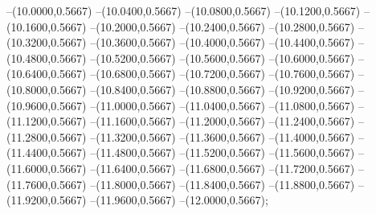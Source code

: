 {	--(10.0000,0.5667)
	--(10.0400,0.5667)
	--(10.0800,0.5667)
	--(10.1200,0.5667)
	--(10.1600,0.5667)
	--(10.2000,0.5667)
	--(10.2400,0.5667)
	--(10.2800,0.5667)
	--(10.3200,0.5667)
	--(10.3600,0.5667)
	--(10.4000,0.5667)
	--(10.4400,0.5667)
	--(10.4800,0.5667)
	--(10.5200,0.5667)
	--(10.5600,0.5667)
	--(10.6000,0.5667)
	--(10.6400,0.5667)
	--(10.6800,0.5667)
	--(10.7200,0.5667)
	--(10.7600,0.5667)
	--(10.8000,0.5667)
	--(10.8400,0.5667)
	--(10.8800,0.5667)
	--(10.9200,0.5667)
	--(10.9600,0.5667)
	--(11.0000,0.5667)
	--(11.0400,0.5667)
	--(11.0800,0.5667)
	--(11.1200,0.5667)
	--(11.1600,0.5667)
	--(11.2000,0.5667)
	--(11.2400,0.5667)
	--(11.2800,0.5667)
	--(11.3200,0.5667)
	--(11.3600,0.5667)
	--(11.4000,0.5667)
	--(11.4400,0.5667)
	--(11.4800,0.5667)
	--(11.5200,0.5667)
	--(11.5600,0.5667)
	--(11.6000,0.5667)
	--(11.6400,0.5667)
	--(11.6800,0.5667)
	--(11.7200,0.5667)
	--(11.7600,0.5667)
	--(11.8000,0.5667)
	--(11.8400,0.5667)
	--(11.8800,0.5667)
	--(11.9200,0.5667)
	--(11.9600,0.5667)
	--(12.0000,0.5667);
}

